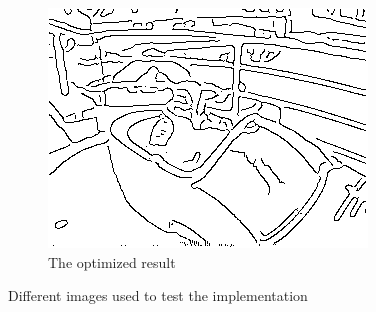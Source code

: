 \documentclass[10pt,final,journal]{IEEEtran}
\begin{document}
\begin{figure}[h!]
\begin{subfigure}[b]{0.3\textwidth}
            \includegraphics[width=\textwidth]{klomp_out}
            \caption{The optimized result}
            \label{fig:app_klomp_out}
    \end{subfigure}

    \caption{Different images used to test the implementation}
    \label{fig:imgdiff}
\end{figure}
\end{document}
